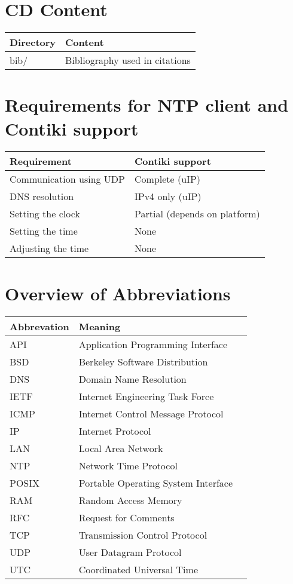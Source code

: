 
\chapter{CD Content}
\begin{tabular}{|l|l|}
	\hline
	Directory & Content \\ \hline
	bib/ & Bibliography used in citations \\
	\hline
\end{tabular}

\chapter{Requirements for NTP client and Contiki support}\label{app:requirements}
\begin{tabular}{|l|l|}
	\hline
	Requirement & Contiki support \\ \hline
	Communication using UDP & Complete (uIP) \\
	DNS resolution & IPv4 only (uIP) \\
	Setting the clock & Partial (depends on platform) \\
	Setting the time & None \\
	Adjusting the time & None \\
	\hline
\end{tabular}

\chapter{Overview of Abbreviations}
\begin{tabular}{|l|l|l|}
	\hline
	Abbrevation & Meaning \\ \hline
	API & Application Programming Interface \\
	BSD & Berkeley Software Distribution \\
	DNS & Domain Name Resolution \\
	IETF & Internet Engineering Task Force \\
	ICMP & Internet Control Message Protocol \\
	IP & Internet Protocol \\
	LAN & Local Area Network \\
	NTP & Network Time Protocol \\
	POSIX & Portable Operating System Interface \\
	RAM & Random Access Memory \\
	RFC & Request for Comments \\
	TCP & Transmission Control Protocol \\
	UDP & User Datagram Protocol \\
	UTC & Coordinated Universal Time \\
	\hline
\end{tabular}
